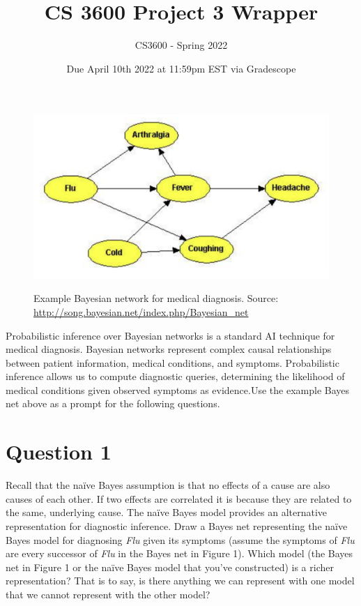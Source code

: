 \documentclass[12pt]{article}
\title{CS 3600 Project 3 Wrapper}
\author{CS3600 - Spring 2022}
\date{Due April 10th 2022 at 11:59pm EST via Gradescope}
\begin{document}
\maketitle

\begin{figure}[htp]
    \includegraphics[width=14cm]{img/P3Q1Network.png}
    \label{fig:network}
    \caption{ Example Bayesian network for medical diagnosis. \newline Source: \url{http://song.bayesian.net/index.php/Bayesian_net}}
\end{figure}

Probabilistic inference over Bayesian networks is a standard AI technique for 
medical diagnosis. Bayesian networks represent complex causal relationships between
patient information, medical conditions, and symptoms. Probabilistic inference 
allows us to compute diagnostic queries, determining the likelihood of medical 
conditions given observed symptoms as evidence.Use the example Bayes net above as a
prompt for the following questions.
\newpage

\section*{Question 1} Recall that the naïve Bayes assumption is that no effects of a
cause are also causes of each other. If two effects are correlated it is because 
they are related to the same, underlying cause. The naïve Bayes model provides an 
alternative representation for diagnostic inference. Draw a Bayes net representing 
the naïve Bayes model for diagnosing \textit{Flu} given its symptoms (assume the 
symptoms of \textit{Flu} are every successor of \textit{Flu} in the Bayes net in 
Figure 1). Which model (the Bayes net in Figure 1 or the naïve Bayes model that 
you've constructed) is a richer representation? That is to say, is there anything 
we can represent with one model that we cannot represent with the other model? \\
\end{document}
